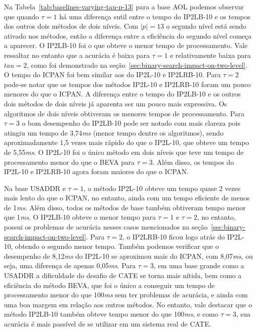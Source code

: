 Na Tabela~\ref{tab:baselines-varying-tau-p-13} para a base AOL podemos observar que quando $\tau=1$ há uma diferença sutil entre o tempo do IP2LB-10 e os tempos dos outros dois métodos de dois níveis. Com $|p|=13$ o segundo nível está sendo ativado nos métodos, então a diferença entre a eficiência do segundo nível começa a aparecer. O IP2LB-10 foi o que obteve o menor tempo de processamento. Vale ressaltar no entanto que a acurácia é baixa para $\tau=1$ e relativamente baixa para $tau=2$, como foi demonstrado na seção~\ref{sec:binary-search-impact-on-two-level}. O tempo do ICPAN foi bem similar aos do IP2L-10 e IP2LRB-10. Para $\tau=2$ pode-se notar que os tempos dos métodos IP2L-10 e IP2LRB-10 foram um pouco menores do que o ICPAN. A diferença entre o tempo do IP2LB-10 e os outros dois métodos de dois níveis já aparenta ser um pouco mais expressiva. Os algoritmos de dois níveis obtiveram os menores tempos de processamento. Para $\tau=3$ o bom desempenho do IP2LB-10 pode ser notado com mais clareza pois atingiu um tempo de 3,74\textit{ms} (menor tempo dentre os algoritmos), sendo aproximadamente 1,5 vezes mais rápido do que o IP2L-10, que obteve um tempo de 5,55\textit{ms}. O IP2L-10 foi o único método em dois níveis que teve um tempo de processamento menor do que o BEVA para $\tau=3$. Além disso, os tempos do IP2L-10 e IP2LRB-10 agora foram maiores do que o ICPAN.

Na base USADDR e $\tau=1$, o método IP2L-10 obteve um tempo quase 2 vezes mais lento do que o ICPAN, no entanto, ainda com um tempo eficiente de menos de 1\textit{ms}. Além disso, todos os métodos de base também obtiveram tempo menor que 1\textit{ms}. O IP2LB-10 obteve o menor tempo para $\tau=1$ e $\tau=2$, no entanto, possui os problemas de acurácia nesses casos mencionados na seção~\ref{sec:binary-search-impact-on-two-level}. Para $\tau=2$, o IP2LRB-10 ficou logo atrás do IP2L-10, obtendo o segundo menor tempo. Também podemos verificar que o desempenho de 8,12\textit{ms} do IP2L-10 se aproximou mais do ICPAN, com 8,07\textit{ms}, ou seja, uma diferença de apenas 0,05\textit{ms}. Para $\tau=3$, em uma base grande como a USADDR a dificuldade do desafio de CATE se torna mais nítida, bem como a eficiência do método BEVA, que foi o único a conseguir um tempo de processamento menor do que 100\textit{ms} sem ter problemas de acurácia, e ainda com uma boa margem em relação aos outros métodos. No entanto, vale destacar que o método IP2LB-10 também obteve tempo menor do que 100\textit{ms}, e como $\tau=3$, sua acurácia é mais passível de se utilizar em um sistema real de CATE. 

